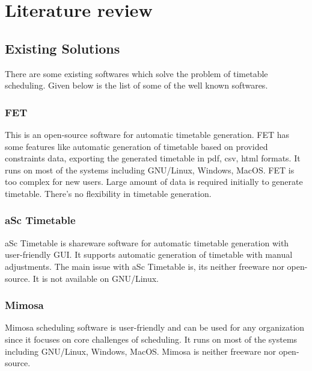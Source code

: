 %

\chapter{Literature review}
\section{Existing Solutions}
There are some existing softwares which solve the problem of timetable scheduling. Given below is the list of some of the well known softwares.
\subsection{FET}
This is an open-source software for automatic timetable generation. FET has some features like automatic generation of timetable based on provided constraints data, exporting the generated timetable in pdf, csv, html formats. It runs on most of the systems including GNU/Linux, Windows, MacOS. FET is too complex for new users. Large amount of data is required initially to generate timetable. There's no flexibility in timetable generation.

\subsection{aSc Timetable}
aSc Timetable is shareware software for automatic timetable generation with user-friendly GUI. It supports automatic generation of timetable with manual adjustments. The main issue with aSc Timetable is, its neither freeware nor open-source. It is not available on GNU/Linux.	

\subsection{Mimosa}
Mimosa scheduling software is user-friendly and can be used for any organization since it focuses on core challenges of scheduling. It runs on most of the systems including GNU/Linux, Windows, MacOS. Mimosa is neither freeware nor open-source.

